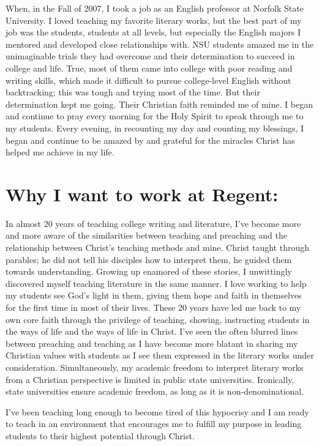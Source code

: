 \documentclass{article}
\begin{document}
When, in the Fall of 2007, I took a job as an English professor at Norfolk State University. 
I loved teaching my favorite literary works, but the best part of my job was the students, students at all levels, but especially the English majors I mentored and developed close relationships with. 
NSU students amazed me in the unimaginable trials they had overcome and their determination to succeed in college and life. 
True, most of them came into college with poor reading and writing skills, which made it difficult to pursue college-level English without backtracking; this was tough and trying most of the time. 
But their determination kept me going. 
Their Christian faith reminded me of mine. 
I began and continue to pray every morning for the Holy Spirit to speak through me to my students.  
Every evening, in recounting my day and counting my blessings, 
I began and continue to be amazed by and grateful for the miracles Christ has helped me achieve in my life. 

\section*{Why I want to work at Regent:}

In almost 20 years of teaching college writing and literature, I’ve become more and more aware of the similarities between teaching and preaching and the relationship between Christ’s teaching methods and mine. Christ taught through parables; he did not tell his disciples how to interpret them, he guided them towards understanding. Growing up enamored of these stories, I unwittingly discovered myself teaching literature in the same manner.  I love working to help my students see God’s light in them, giving them hope and faith in themselves for the first time in most of their lives. These 20 years have led me back to my own core faith through the privilege of teaching, showing, instructing students in the ways of life and the ways of life in Christ. I’ve seen the often blurred lines between preaching and teaching as I have become more blatant in sharing my Christian values with students as I see them expressed in the literary works under consideration. Simultaneously, my academic freedom to interpret literary works from a Christian perspective is limited in public state universities. Ironically, state universities ensure academic freedom, as long as it is non-denominational. 

I’ve been teaching long enough to become tired of this hypocrisy and I am ready to teach in an environment that encourages me to fulfill my purpose in leading students to  their highest potential through Christ. 
\end{document}
